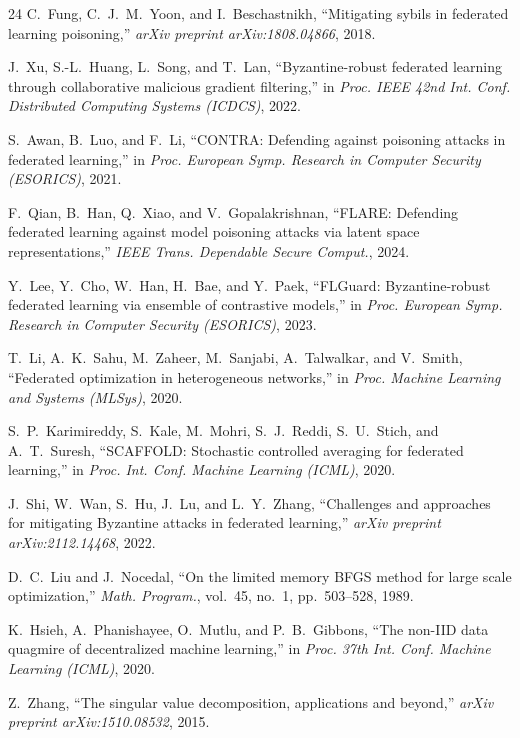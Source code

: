 \documentclass[journal]{IEEEtran}
\begin{document}
\begin{thebibliography}{24}
C.~Fung, C.~J.~M.~Yoon, and I.~Beschastnikh, ``Mitigating sybils in federated learning poisoning,'' \textit{arXiv preprint arXiv:1808.04866}, 2018.

J.~Xu, S.-L.~Huang, L.~Song, and T.~Lan, ``Byzantine-robust federated learning through collaborative malicious gradient filtering,'' in \textit{Proc. IEEE 42nd Int. Conf. Distributed Computing Systems (ICDCS)}, 2022.

S.~Awan, B.~Luo, and F.~Li, ``CONTRA: Defending against poisoning attacks in federated learning,'' in \textit{Proc. European Symp. Research in Computer Security (ESORICS)}, 2021.

F.~Qian, B.~Han, Q.~Xiao, and V.~Gopalakrishnan, ``FLARE: Defending federated learning against model poisoning attacks via latent space representations,'' \textit{IEEE Trans. Dependable Secure Comput.}, 2024.

Y.~Lee, Y.~Cho, W.~Han, H.~Bae, and Y.~Paek, ``FLGuard: Byzantine-robust federated learning via ensemble of contrastive models,'' in \textit{Proc. European Symp. Research in Computer Security (ESORICS)}, 2023.

T.~Li, A.~K.~Sahu, M.~Zaheer, M.~Sanjabi, A.~Talwalkar, and V.~Smith, ``Federated optimization in heterogeneous networks,'' in \textit{Proc. Machine Learning and Systems (MLSys)}, 2020.

S.~P.~Karimireddy, S.~Kale, M.~Mohri, S.~J.~Reddi, S.~U.~Stich, and A.~T.~Suresh, ``SCAFFOLD: Stochastic controlled averaging for federated learning,'' in \textit{Proc. Int. Conf. Machine Learning (ICML)}, 2020.

J.~Shi, W.~Wan, S.~Hu, J.~Lu, and L.~Y.~Zhang, ``Challenges and approaches for mitigating Byzantine attacks in federated learning,'' \textit{arXiv preprint arXiv:2112.14468}, 2022.

D.~C.~Liu and J.~Nocedal, ``On the limited memory BFGS method for large scale optimization,'' \textit{Math. Program.}, vol.~45, no.~1, pp.~503--528, 1989.

K.~Hsieh, A.~Phanishayee, O.~Mutlu, and P.~B.~Gibbons, ``The non-IID data quagmire of decentralized machine learning,'' in \textit{Proc. 37th Int. Conf. Machine Learning (ICML)}, 2020.

Z.~Zhang, ``The singular value decomposition, applications and beyond,'' \textit{arXiv preprint arXiv:1510.08532}, 2015.


\end{thebibliography}
\end{document}
